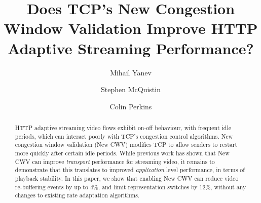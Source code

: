 \documentclass[10pt,sigconf,anonymous]{acmart}
\begin{document}
\title{Does TCP's New Congestion Window Validation Improve HTTP Adaptive Streaming Performance?}

\author{Mihail Yanev}


\author{Stephen McQuistin}
    \email{}

\author{Colin Perkins}



\begin{abstract}

HTTP adaptive streaming video flows exhibit on-off behaviour, with frequent idle periods, which can interact poorly with TCP's congestion control algorithms. New congestion window validation (New CWV) modifies TCP to allow senders to restart more quickly after certain idle periods. While previous work has shown that New CWV can improve \emph{transport} performance for streaming video, it remains to demonstrate that this translates to improved \emph{application} level performance, in terms of playback stability. In this paper, we show that enabling New CWV can reduce video re-buffering events by up to 4\%, and limit representation switches by 12\%, without any changes to existing rate adaptation algorithms.

\end{abstract}
\maketitle
\end{document}
